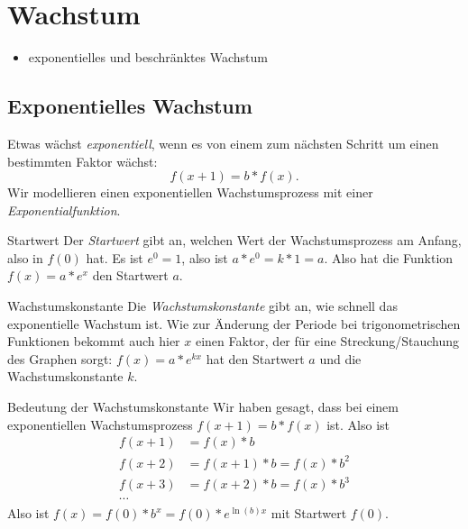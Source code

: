 \chapter{Wachstum}
\begin{inhalt}
  \begin{itemize}
    \item exponentielles und beschränktes Wachstum
  \end{itemize}
\end{inhalt}

\section{Exponentielles Wachstum}

Etwas wächst \emph{exponentiell}, wenn es von einem zum nächsten Schritt um einen bestimmten Faktor wächst:
\begin{equation*}
  f(x+1)=b*f(x).
\end{equation*}
Wir modellieren einen exponentiellen Wachstumsprozess mit einer \emph{Exponentialfunktion}.

\begin{bla}{Startwert}
  Der \emph{Startwert} gibt an, welchen Wert der Wachstumsprozess am Anfang, also in $f(0)$ hat. Es ist $e^0=1$, also ist $a*e^0=k*1=a$. Also hat die Funktion $f(x)=a*e^x$ den Startwert $a$.
\end{bla}

\begin{bla}{Wachstumskonstante}
  Die \emph{Wachstumskonstante} gibt an, wie schnell das exponentielle Wachstum ist. Wie zur Änderung der Periode bei trigonometrischen Funktionen bekommt auch hier $x$ einen Faktor, der für eine Streckung/Stauchung des Graphen sorgt: $f(x)=a*e^{kx}$ hat den Startwert $a$ und die Wachstumskonstante $k$.
\end{bla}

\begin{bla}{Bedeutung der Wachstumskonstante}
  Wir haben gesagt, dass bei einem exponentiellen Wachstumsprozess $f(x+1)=b*f(x)$ ist. Also ist
  \begin{align*}
    f(x+1) &= f(x)*b \\
    f(x+2) &= f(x+1)*b = f(x)*b^2 \\
    f(x+3) &= f(x+2)*b = f(x)*b^3 \\
    \cdots
  \end{align*}
  Also ist $f(x)=f(0)*b^x=f(0)*e^{\ln(b)x}$ mit Startwert $f(0)$.
\end{bla}

